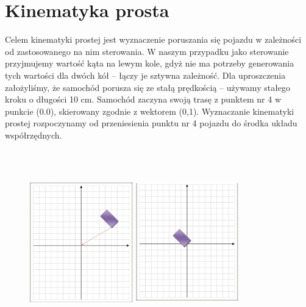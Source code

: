 \documentclass[a4paper, 12pt]{report}
\begin{document}
		\section{Kinematyka prosta}
			Celem kinematyki prostej jest wyznaczenie poruszania się pojazdu w zależności od zastosowanego na nim sterowania. W naszym przypadku jako sterowanie przyjmujemy wartość kąta na lewym kole, gdyż nie ma potrzeby generowania tych wartości dla dwóch kół -- łączy je sztywna zależność. Dla uproszczenia założyliśmy, że samochód porusza się ze stałą prędkością -- używamy stałego kroku o długości 10 cm. Samochód zaczyna swoją trasę z punktem nr 4 w punkcie (0.0), skierowany zgodnie z wektorem (0,1).
			\newline
			\newline
			Wyznaczanie kinematyki prostej rozpoczynamy od przeniesienia punktu nr 4 pojazdu do środka układu współrzędnych. 
			\begin{figure}[H]
				\centering
				\includegraphics[height=8cm,width=0.4\textwidth]{./img/1.png}
				\includegraphics[height=8cm,width=0.4\textwidth]{./img/2.png}
			\end{figure}
\end{document}
